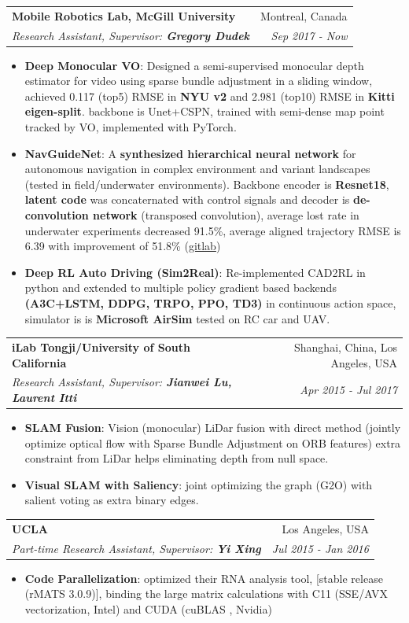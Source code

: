 \documentclass[letterpaper,10pt]{article}
\makeatletter
\newcommand{\resumeItem}[2]{
  \item\small{
    \textbf{#1}{: #2 \vspace{-2pt}}
  }
}
\newcommand{\resumeSubheading}[4]{
  \vspace{-1pt}\item[]
  \begin{tabular*}{0.98\textwidth}{l@{\extracolsep{\fill}}r}
      \hspace{-10pt}\textbf{#1} & #2 \\
      \hspace{-10pt}\textit{\small#3} & \textit{\small #4} \\
    \end{tabular*}\vspace{-5pt}
}
\newcommand{\resumeItemListStart}{\begin{itemize}}
\newcommand{\resumeItemListEnd}{\end{itemize}\vspace{-5pt}}
\makeatother
\begin{document}
    \resumeSubheading
      {Mobile Robotics Lab, McGill University}{Montreal, Canada}
      {Research Assistant, Supervisor: \textbf{Gregory Dudek}}{Sep 2017 - Now}
      \resumeItemListStart
        \resumeItem{Deep Monocular VO}
          { Designed a semi-supervised monocular depth estimator for video using sparse bundle adjustment in a sliding window, achieved 0.117 (top5) RMSE in \textbf{NYU v2} and 2.981 (top10) RMSE in \textbf{Kitti eigen-split}. backbone is Unet+CSPN, trained with semi-dense map point tracked by VO, implemented with PyTorch. }
        \resumeItem{NavGuideNet}
          {A \textbf{synthesized hierarchical neural network} for autonomous navigation in complex environment and variant landscapes (tested in field/underwater environments). Backbone encoder is \textbf{Resnet18}, \textbf{latent code} was concaternated with control signals and decoder is \textbf{de-convolution network} (transposed convolution), average lost rate in underwater experiments decreased 91.5\%, average aligned trajectory RMSE is 6.39 with improvement of 51.8\%
           (\href{ssh://git@gitlab.mcgillmobilerobotics.mooo.com:2289/travis/AutoDriving.git}{\textcolor{linkblue}{gitlab}})}
        \resumeItem{Deep RL Auto Driving (Sim2Real)}
          {Re-implemented CAD2RL in python and extended to multiple policy gradient based backends \textbf{(A3C+LSTM, DDPG, TRPO, PPO, TD3)} in continuous action space, simulator is is \textbf{Microsoft AirSim} tested on RC car and UAV.
          }
      \resumeItemListEnd

    \resumeSubheading
      {iLab Tongji/University of South California}{Shanghai, China, Los Angeles, USA}
      {Research Assistant, Supervisor: \textbf{Jianwei Lu, Laurent Itti}}{Apr 2015 - Jul 2017}
      \resumeItemListStart
        \resumeItem{SLAM Fusion}
          {Vision (monocular) LiDar fusion with direct method (jointly optimize optical flow with Sparse Bundle Adjustment on ORB features) extra constraint from LiDar helps eliminating depth from null space. }
        \resumeItem{Visual SLAM with Saliency}
          { joint optimizing the graph (G2O) with salient voting as extra binary edges.}
      \resumeItemListEnd

    \resumeSubheading
      {UCLA}{Los Angeles, USA}
      {Part-time Research Assistant, Supervisor: \textbf{Yi Xing}}{Jul 2015 - Jan 2016}
      \resumeItemListStart
        \resumeItem{Code Parallelization}
          {optimized their RNA analysis tool, [stable release (rMATS 3.0.9)], binding the large matrix calculations with C11 (SSE/AVX vectorization, Intel) and CUDA (cuBLAS , Nvidia) }
      \resumeItemListEnd
\end{document}
